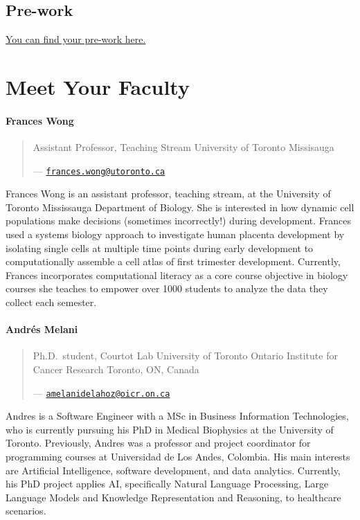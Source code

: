 \documentclass[
]{book}
\begin{document}
\section{Pre-work}\label{pre-work}

\href{https://docs.google.com/forms/d/e/1FAIpQLSeagUvd0QrDGtmnR3B5h2xDOXtvznYoYkkc13h8raaOKkO_HA/viewform}{You can find your pre-work here.}

\chapter{Meet Your Faculty}\label{meet-your-faculty}

\subsubsection{Frances Wong}\label{frances-wong}

\begin{quote}
Assistant Professor, Teaching Stream
University of Toronto Missisauga

--- \href{mailto:frances.wong@utoronto.ca}{\nolinkurl{frances.wong@utoronto.ca}}
\end{quote}

Frances Wong is an assistant professor, teaching stream, at the University of Toronto
Mississauga Department of Biology. She is interested in how dynamic cell populations make
decisions (sometimes incorrectly!) during development. Frances used a systems biology
approach to investigate human placenta development by isolating single cells at multiple time
points during early development to computationally assemble a cell atlas of first trimester
development. Currently, Frances incorporates computational literacy as a core course
objective in biology courses she teaches to empower over 1000 students to analyze the data
they collect each semester.

\subsubsection{Andrés Melani}\label{andruxe9s-melani}

\begin{quote}
Ph.D.~student, Courtot Lab
University of Toronto \textbar{} Ontario Institute for Cancer Research
Toronto, ON, Canada

--- \href{mailto:amelanidelahoz@oicr.on.ca}{\nolinkurl{amelanidelahoz@oicr.on.ca}}
\end{quote}

Andres is a Software Engineer with a MSc in Business Information Technologies, who is
currently pursuing his PhD in Medical Biophysics at the University of Toronto. Previously,
Andres was a professor and project coordinator for programming courses at Universidad de
Los Andes, Colombia. His main interests are Artificial Intelligence, software development, and
data analytics. Currently, his PhD project applies AI, specifically Natural Language
Processing, Large Language Models and Knowledge Representation and Reasoning, to
healthcare scenarios.
\end{document}
